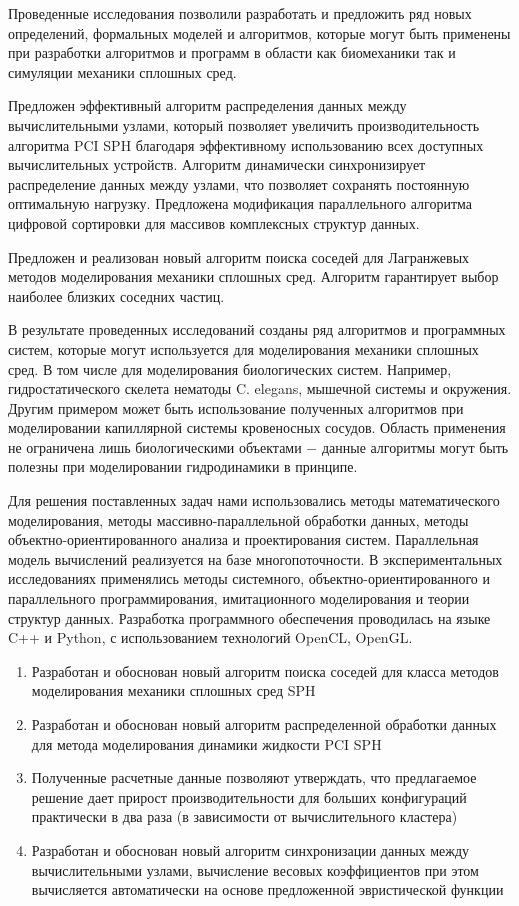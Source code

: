 {\novelty}
Проведенные исследования позволили разработать и предложить ряд новых определений, формальных моделей и алгоритмов, которые могут быть применены при разработки алгоритмов и программ в области как биомеханики так и симуляции механики сплошных сред.

Предложен эффективный алгоритм распределения данных между вычислительными узлами, который позволяет увеличить производительность алгоритма PCI SPH благодаря эффективному использованию всех доступных вычислительных устройств. Алгоритм динамически синхронизирует распределение данных между узлами, что позволяет сохранять постоянную  оптимальную нагрузку. Предложена модификация параллельного алгоритма цифровой сортировки для массивов комплексных структур данных.

Предложен и реализован новый алгоритм поиска соседей для Лагранжевых методов моделирования механики сплошных сред. Алгоритм гарантирует выбор наиболее близких соседних частиц.

{\influence} В результате проведенных исследований созданы ряд алгоритмов и программных систем, которые могут используется для моделирования механики сплошных сред. В том числе для моделирования биологических систем. Например, гидростатического скелета нематоды C. elegans, мышечной системы и окружения. Другим примером может быть использование полученных алгоритмов при моделировании капиллярной системы кровеносных сосудов. Область применения не ограничена лишь биологическими объектами − данные алгоритмы могут быть полезны при моделировании гидродинамики в принципе.

{\methods} Для решения поставленных задач нами использовались методы математического моделирования, методы массивно-параллельной обработки данных, методы объектно-ориентированного анализа и проектирования систем. Параллельная модель вычислений реализуется на базе многопоточности. В эксперимен­тальных исследованиях применялись методы системного, объектно-ориенти­рованного и параллельного программирования, имитационного моделирования и теории структур данных. Разработка программного обеспечения проводилась на языке C++ и Python, с использованием технологий OpenCL, OpenGL.

  {}
\begin{enumerate}
  \item Разработан и обоснован новый алгоритм поиска соседей для класса методов моделирования механики сплошных сред SPH
  \item Разработан и обоснован новый алгоритм распределенной обработки данных для метода моделирования динамики жидкости PCI SPH
  \item Полученные расчетные данные позволяют утверждать, что предлагаемое решение дает прирост производительности для больших конфигураций практически в два раза (в зависимости от вычислительного кластера)
  \item Разработан и обоснован новый алгоритм синхронизации данных между вычислительными узлами, вычисление весовых коэффициентов при этом вычисляется автоматически на основе предложенной эвристической функции
\end{enumerate}

